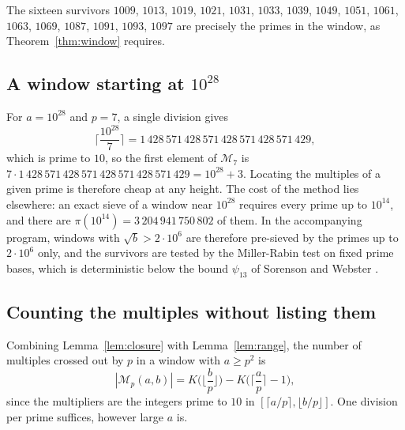 \documentclass[11pt]{amsart}
\theoremstyle{definition}
\theoremstyle{remark}
\newcommand{\Mult}{\mathcal{M}}
\begin{document}
The sixteen survivors $1009$, $1013$, $1019$, $1021$, $1031$, $1033$, $1039$, $1049$, $1051$, $1061$, $1063$, $1069$, $1087$, $1091$, $1093$, $1097$ are precisely the primes in the window, as Theorem~\ref{thm:window} requires.

\subsection{A window starting at $10^{28}$}
For $a=10^{28}$ and $p=7$, a single division gives
\[
\Big\lceil\frac{10^{28}}{7}\Big\rceil=1\,428\,571\,428\,571\,428\,571\,428\,571\,429,
\]
which is prime to $10$, so the first element of $\Mult_7$ is $7\cdot 1\,428\,571\,428\,571\,428\,571\,428\,571\,429=10^{28}+3$. Locating the multiples of a given prime is therefore cheap at any height. The cost of the method lies elsewhere: an exact sieve of a window near $10^{28}$ requires every prime up to $10^{14}$, and there are $\pi(10^{14})=3\,204\,941\,750\,802$ of them. In the accompanying program, windows with $\sqrt b>2\cdot 10^6$ are therefore pre-sieved by the primes up to $2\cdot 10^6$ only, and the survivors are tested by the Miller-Rabin test on fixed prime bases, which is deterministic below the bound $\psi_{13}$ of Sorenson and Webster \cite{SorensonWebster2017}.

\subsection{Counting the multiples without listing them}
Combining Lemma~\ref{lem:closure} with Lemma~\ref{lem:range}, the number of multiples crossed out by $p$ in a window with $a\ge p^2$ is
\[
|\Mult_p(a,b)|=K\Big(\Big\lfloor\frac{b}{p}\Big\rfloor\Big)-K\Big(\Big\lceil\frac{a}{p}\Big\rceil-1\Big),
\]
since the multipliers are the integers prime to $10$ in $[\lceil a/p\rceil,\lfloor b/p\rfloor]$. One division per prime suffices, however large $a$ is.
\end{document}
